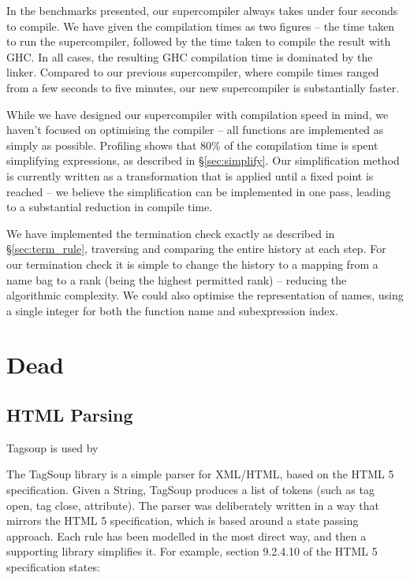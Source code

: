\documentclass[draft]{sigplanconf}
\begin{document}
In the benchmarks presented, our supercompiler always takes under four seconds to compile. We have given the compilation times as two figures -- the time taken to run the supercompiler, followed by the time taken to compile the result with GHC. In all cases, the resulting GHC compilation time is dominated by the linker. Compared to our previous supercompiler, where compile times ranged from a few seconds to five minutes, our new supercompiler is substantially faster.

While we have designed our supercompiler with compilation speed in mind, we haven't focused on optimising the compiler -- all functions are implemented as simply as possible. Profiling shows that 80\% of the compilation time is spent simplifying expressions, as described in \S\ref{sec:simplify}. Our simplification method is currently written as a transformation that is applied until a fixed point is reached -- we believe the simplification can be implemented in one pass, leading to a substantial reduction in compile time.

We have implemented the termination check exactly as described in \S\ref{sec:term_rule}, traversing and comparing the entire history at each step. For our termination check it is simple to change the history to a mapping from a name bag to a rank (being the highest permitted rank) -- reducing the algorithmic complexity. We could also optimise the representation of names, using a single integer for both the function name and subexpression index.

\section{Dead}
\subsection{HTML Parsing}
\label{sec:tagsoup}

Tagsoup is used by \cite{malde:using_tagsoup}

The TagSoup library \cite{tagsoup} is a simple parser for XML/HTML, based on the HTML 5 specification. Given a String, TagSoup produces a list of tokens (such as tag open, tag close, attribute). The parser was deliberately written in a way that mirrors the HTML 5 specification, which is based around a state passing approach. Each rule has been modelled in the most direct way, and then a supporting library simplifies it. For example, section 9.2.4.10 of the HTML 5 specification states:
\end{document}
